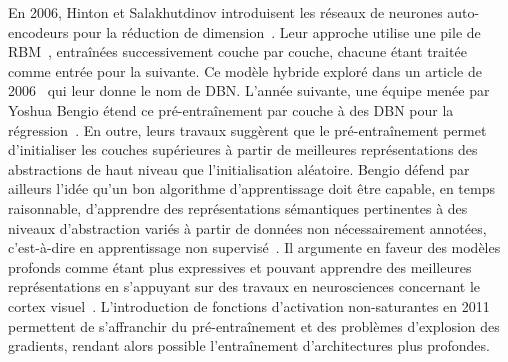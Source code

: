 En 2006, Hinton et Salakhutdinov introduisent les réseaux de neurones auto-encodeurs pour la réduction de dimension~\cite{hinton_reducing_2006}. Leur approche utilise une pile de \gls{RBM}~\cite{ackley_learning_1985,salakhutdinov_deep_2009}, entraînées successivement couche par couche, chacune étant traitée comme entrée pour la suivante. Ce modèle hybride exploré dans un article de 2006~\cite{hinton_fast_2006} qui leur donne le nom de \gls{DBN}. L'année suivante, une équipe menée par Yoshua Bengio étend ce pré-entraînement par couche à des \gls{DBN} pour la régression~\cite{bengio_greedy_2007}. En outre, leurs travaux suggèrent que le pré-entraînement permet d'initialiser les couches supérieures à partir de meilleures représentations des abstractions de haut niveau que l'initialisation aléatoire. Bengio défend par ailleurs l'idée qu'un bon algorithme d'apprentissage doit être capable, en temps raisonnable, d'apprendre des représentations sémantiques pertinentes à des niveaux d'abstraction variés à partir de données non nécessairement annotées, c'est-à-dire en apprentissage non supervisé~\cite{bengio_learning_2009}. Il argumente en faveur des modèles profonds comme étant plus expressives et pouvant apprendre des meilleures représentations en s'appuyant sur des travaux en neurosciences concernant le cortex visuel~\cite{serre_quantitative_2007}. L'introduction de fonctions d'activation non-saturantes en 2011~\cite{glorot_deep_2011} permettent de s'affranchir du pré-entraînement et des problèmes d'explosion des gradients, rendant alors possible l'entraînement d'architectures plus profondes.

